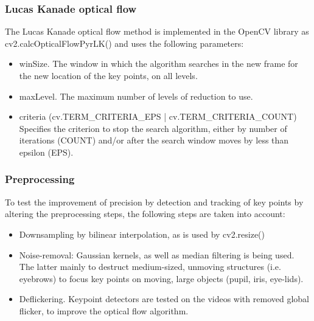 \documentclass[Bachelorarbeit.tex]{subfiles}
\begin{document}
\subsubsection{Lucas Kanade optical flow}
The Lucas Kanade optical flow method is implemented in the OpenCV library as cv2.calcOpticalFlowPyrLK() and uses the following parameters:
\begin{itemize}
	\item winSize. The window in which the algorithm searches in the new frame for the new location of the key points, on all levels.
	\item maxLevel. The maximum number of levels of reduction to use.
	\item criteria (cv.TERM\_CRITERIA\_EPS | cv.TERM\_CRITERIA\_COUNT) Specifies the criterion to stop the search algorithm, either by number of iterations (COUNT) and/or after the search window moves by less than epsilon (EPS).
\end{itemize}

\subsubsection{Preprocessing}
To test the improvement of precision by detection and tracking of key points by altering the preprocessing steps, the following steps are taken into account:
\begin{itemize}
	\item Downsampling by bilinear interpolation, as is used by cv2.resize()
	\item Noise-removal: Gaussian kernels, as well as median filtering is being used. The latter mainly to destruct medium-sized, unmoving structures (i.e. eyebrows) to focus key points on moving, large objects (pupil, iris, eye-lids).
	\item Deflickering. Keypoint detectors are tested on the videos with removed global flicker, to improve the optical flow algorithm. 
\end{itemize}




\FloatBarrier
\end{document}
